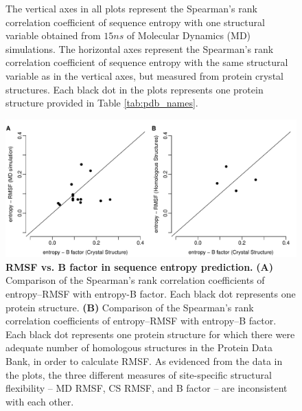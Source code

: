 \documentclass[12pt]{article}
\begin{document}
\begin{figure}[t]
{                     The vertical axes in all plots represent the Spearman's rank correlation coefficient of sequence entropy with one structural variable obtained from $15ns$ of Molecular Dynamics (MD) simulations. The horizontal axes represent the Spearman's rank correlation coefficient of sequence entropy with the same structural variable as in the vertical axes, but measured from protein crystal structures. Each black dot in the plots represents one protein structure provided in Table \ref{tab:pdb_names}. %
                     }
            \label{fig:cor_cr_md}
            \end{figure}

            \begin{figure}[t]
            \begin{center}
                \includegraphics[height=0.35\textheight]{cor_entropy_bfca_rmsf.pdf}
            \end{center}
            \caption{
                     {\bf RMSF vs. B factor in sequence entropy prediction.} {\bf (A)} Comparison of the Spearman's rank correlation coefficients of entropy--RMSF with entropy-B factor. Each black dot represents one protein structure. {\bf (B)} Comparison of the Spearman's rank correlation coefficients of entropy--RMSF with entropy--B factor. Each black dot represents one protein structure for which there were adequate number of homologous structures in the Protein Data Bank, in order to calculate RMSF. As evidenced from the data in the plots, the three different measures of site-specific structural flexibility -- MD RMSF, CS RMSF, and B factor -- are inconsistent with each other.
                     }
            \label{fig:cor_entropy_bfca_rmsf}
            \end{figure}
\end{document}

